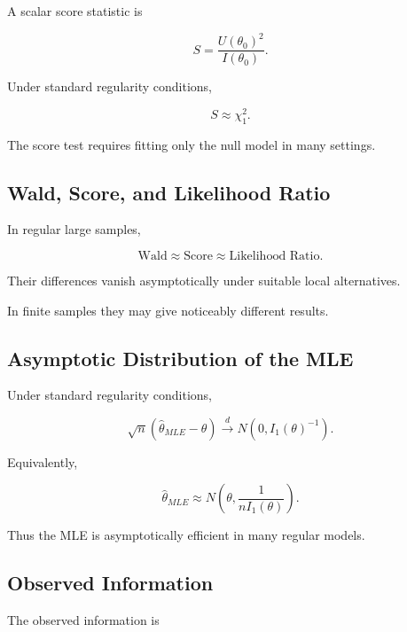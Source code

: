 A scalar score statistic is

\[
\boxed{
S
=
\frac{
U(\theta_0)^2
}{
I(\theta_0)
}.
}
\]

Under standard regularity conditions,

\[
\boxed{
S
\approx
\chi^2_1.
}
\]

The score test requires fitting only the null model in many settings.

\subsection{Wald, Score, and Likelihood Ratio}
\label{subsec:wald-score-lr-mathstat}

In regular large samples,

\[
\boxed{
\text{Wald}
\approx
\text{Score}
\approx
\text{Likelihood Ratio}.
}
\]

Their differences vanish asymptotically under suitable local
alternatives.

In finite samples they may give noticeably different results.

\subsection{Asymptotic Distribution of the MLE}
\label{subsec:asymptotic-mle}

Under standard regularity conditions,

\[
\boxed{
\sqrt{n}
(
\widehat{\theta}_{MLE}-\theta
)
\xrightarrow{d}
N
\left(
0,
I_1(\theta)^{-1}
\right).
}
\]

Equivalently,

\[
\boxed{
\widehat{\theta}_{MLE}
\approx
N
\left(
\theta,
\frac1{
nI_1(\theta)
}
\right).
}
\]

Thus the MLE is asymptotically efficient in many regular models.

\subsection{Observed Information}
\label{subsec:observed-information}

The observed information is

